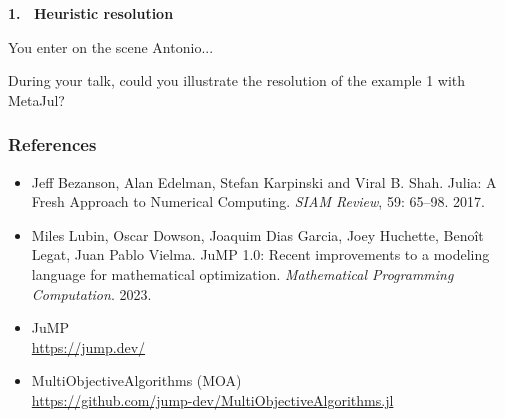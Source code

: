\documentclass[]{beamer}
\begin{document}

\begin{frame}

\centerline 
{\Large \textbf{1. \ Heuristic resolution}}

\end{frame}

%
%
\begin{frame}

You enter on the scene Antonio...
\bigskip

During your talk, could you illustrate the resolution of the example 1 with MetaJul?

\end{frame}

%
%
\begin{frame}
  \frametitle{References}
\vspace{3mm}

{\scriptsize
\begin{itemize}

\item 
Jeff Bezanson, Alan Edelman, Stefan Karpinski and Viral B. Shah.
Julia: A Fresh Approach to Numerical Computing. 
\textit{SIAM Review}, 59: 65--98. 2017.
\vspace{2mm}

\item 
 Miles Lubin, Oscar Dowson, Joaquim {Dias Garcia}, Joey Huchette, Beno{\^i}t Legat, Juan Pablo Vielma.
{JuMP} 1.0: {R}ecent improvements to a modeling language for mathematical optimization.
\textit{Mathematical Programming Computation}.
2023.
\vspace{2mm}


\item JuMP\\
    \url{https://jump.dev/}
\vspace{2mm}

\item MultiObjectiveAlgorithms (MOA)    \\
    \url{https://github.com/jump-dev/MultiObjectiveAlgorithms.jl}
\vspace{2mm}
    
\end{itemize}
}
   
\end{frame}
\end{document}
